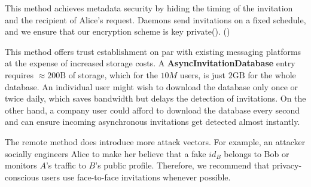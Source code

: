 This method achieves metadata security by hiding the timing of the invitation and the recipient of Alice's request. Daemons send invitations on a fixed schedule, and we ensure that our encryption scheme is key private(). ()

This method offers trust establishment on par with existing messaging platforms at the expense of increased storage costs. A \textbf{AsyncInvitationDatabase} entry requires $\approx200\text{B}$ of storage, which for the $10M$ users, is just $2\text{GB}$ for the whole database. An individual user might wish to download the database only once or twice daily, which saves bandwidth but delays the detection of invitations. On the other hand, a company user could afford to download the database every second and can ensure incoming asynchronous invitations get detected almost instantly.

The remote method does introduce more attack vectors. For example, an attacker socially engineers Alice to make her believe that a fake $id_B$ belongs to Bob or monitors $A$'s traffic to $B$'s public profile. Therefore, we recommend that privacy-conscious users use face-to-face invitations whenever possible.